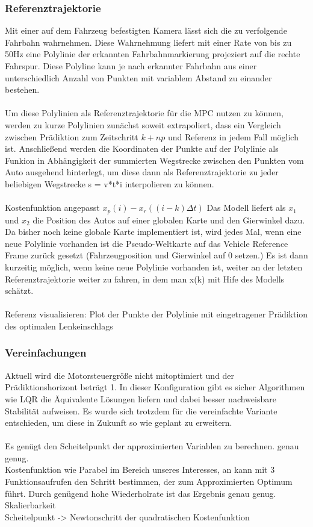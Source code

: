 \subsubsection{Referenztrajektorie}
Mit einer auf dem Fahrzeug befestigten Kamera lässt sich die zu verfolgende Fahrbahn wahrnehmen. Diese Wahrnehmung liefert mit einer Rate von bis zu 50Hz eine Polylinie der erkannten Fahrbahnmarkierung projeziert auf die rechte Fahrspur. Diese Polyline kann je nach erkannter Fahrbahn aus einer unterschiedlich Anzahl von Punkten mit variablem Abstand zu einander bestehen.\\ \\
Um diese Polylinien als Referenztrajektorie für die MPC nutzen zu können, werden zu kurze Polylinien zunächst soweit extrapoliert, dass ein Vergleich zwischen Prädiktion zum Zeitschritt $k+np$ und Referenz in jedem Fall möglich ist. Anschließend werden die Koordinaten der Punkte auf der Polylinie als Funkion in Abhängigkeit der summierten Wegstrecke zwischen den Punkten vom Auto ausgehend hinterlegt, um diese dann als Referenztrajektorie zu jeder beliebigen Wegstrecke s = v*t*i interpolieren zu können.\\ \\
Kostenfunktion angepasst $x_p(i)-x_r((i-k)\Delta t)$
Das Modell liefert als $x_1$ und $x_2$ die Position des Autos auf einer globalen Karte und den Gierwinkel dazu. Da bisher noch keine globale Karte implementiert ist, wird jedes Mal, wenn eine neue Polylinie vorhanden ist die Pseudo-Weltkarte auf das Vehicle Reference Frame zurück gesetzt (Fahrzeugposition und Gierwinkel auf 0 setzen.) Es ist dann kurzeitig möglich, wenn keine neue Polylinie vorhanden ist, weiter an der letzten Referenztrajektorie weiter zu fahren, in dem man x(k) mit Hife des Modells schätzt.\\ \\
Referenz visualisieren: Plot der Punkte der Polylinie mit eingetragener Prädiktion des optimalen Lenkeinschlags\\
\subsubsection{Vereinfachungen}
Aktuell wird die Motorsteuergröße nicht mitoptimiert und der Prädiktionshorizont beträgt 1. In dieser Konfiguration gibt es sicher Algorithmen wie LQR die Äquivalente Lösungen liefern und dabei besser nachweisbare Stabilität aufweisen. Es wurde sich trotzdem für die vereinfachte Variante entschieden, um diese in Zukunft so wie geplant zu erweitern.\\ \\
Es genügt den Scheitelpunkt der approximierten Variablen zu berechnen. genau genug.\\
Kostenfunktion wie Parabel im Bereich unseres Interesses, an kann mit 3 Funktionsaufrufen den Schritt bestimmen, der zum Approximierten Optimum führt. Durch genügend hohe Wiederholrate ist das Ergebnis genau genug.
Skalierbarkeit\\
Scheitelpunkt -> Newtonschritt der quadratischen Kostenfunktion\\


